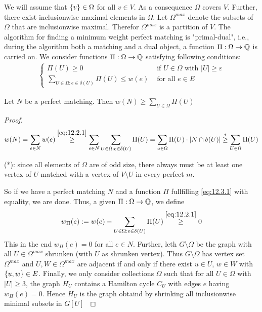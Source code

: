 We will assume that $\left\{v\right\} \in \Omega$ for all $v \in V$. As a consequence $\Omega$ covers $V$. Further, there exist inclusionwise maximal elements in $\Omega$. Let $\Omega^{max}$ denote the subsets of $\Omega$ that are inclusionwise maximal. Therefor $\Omega^{max}$ is a partition of $V$. The algorithm for finding a minimum weight perfect matching is "primal-dual", i.e., during the algorithm both a matching and a dual object, a function $\Pi: \Omega \rightarrow \mathbb{Q}$ is carried on. We consider functions $\Pi: \Omega \rightarrow \mathbb{Q}$ satisfying following conditions:
\begin{align}\label{eq:12.2.1}
	\begin{cases}
		\Pi(U) \geq 0 & \text{ if } U \in \Omega \text{ with } |U| \geq \varepsilon \\
		\sum\limits_{U \in \Omega:  e \in \delta(U)} \Pi(U) \leq w(e) & \text{ for all } e \in E
	\end{cases}
\end{align}

\begin{lem}
	Let $N$ be a perfect matching. Then $w(N) \geq \sum\limits_{U \in \Omega}\Pi(U)$
\end{lem}

\begin{proof}
	\begin{align}\label{eq:12.3.1}
		w(N) = \sum\limits_{e \in N} w(e) \stackrel{\ref{eq:12.2.1}}{\geq} \sum\limits_{e \in N} \sum\limits_{U \in \Omega: e \in \delta(U)} \Pi(U) = \sum\limits_{u \in \Omega} \Pi(U) \cdot | N \cap \delta(U)|\stackrel{*}{\geq} \sum\limits_{U \in \Omega}\Pi(U)
	\end{align}
	
	(*): since all elements of $\Omega$ are of odd size, there always must be at least one vertex of $U$ matched with a vertex of $V \setminus U$ in every perfect $m$.
	
	So if we have a perfect matching $N$ and a function $\Pi$ fullfilling \ref{eq:12.3.1} with equality, we are done. Thus, a given $\Pi: \Omega \rightarrow \mathbb{Q}$, we define \[
	w_\Pi(e):=w(e)-\sum\limits_{U \in \Omega: e \in \delta(U)} \Pi(U) \stackrel{\ref{eq:12.2.1}}{\geq} 0
\] This in the end $w_\Pi(e)=0$ for all $e \in N$. Further, leth $G \setminus \Omega$ be the graph with all $U \in \Omega^{max}$ shrunken (with $U$ as shrunken vertex). Thus  $G \setminus \Omega$ has vertex set $\Omega^{max}$ and $U,W \in \Omega^{max}$ are adjacent if and only if there exist $u \in U$, $w \in W$ with $\left\{u,w\right\} \in E$. Finally, we only consider collections $\Omega$ such that for all $U\in \Omega$ with $|U| \geq 3$, the graph $H_U$ contains a Hamilton cycle $C_U$ with edges $e$ having $w_\Pi(e) = 0$. Hence $H_U$ is the graph obtaind by shrinking all inclusionwise minimal subsets in $G[U]$ \label{rel:12.2.2}
\end{proof}

